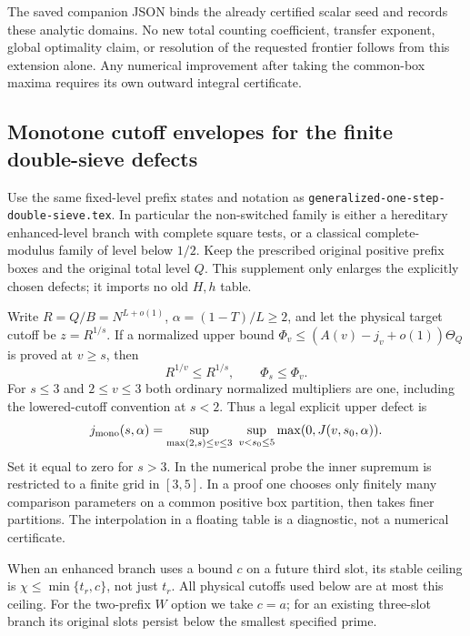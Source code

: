 \documentclass[11pt]{article}
\begin{document}
The saved companion JSON binds the already certified scalar seed
and records these analytic domains.  No new total counting
coefficient, transfer exponent, global optimality claim, or
resolution of the requested frontier follows from this extension
alone.  Any numerical improvement after taking the common-box
maxima requires its own outward integral certificate.

\subsection{Monotone cutoff envelopes for the finite double-sieve defects}
\label{sec:monotone-one-step-double-sieve}

Use the same fixed-level prefix states and notation as
\texttt{generalized-one-step-double-sieve.tex}. In particular the
non-switched family is either a hereditary enhanced-level branch
with complete square tests, or a classical complete-modulus family
of level below $1/2$. Keep the prescribed original positive prefix
boxes and the original total level $Q$. This supplement only enlarges
the explicitly chosen defects; it imports no old $H,h$ table.

Write $R=Q/B=N^{L+o(1)}$, $\alpha=(1-T)/L\ge2$, and let the
physical target cutoff be $z=R^{1/s}$. If a normalized upper bound
$\Phi_v\le(A(v)-j_v+o(1))\Theta_Q$ is proved at $v\ge s$, then
\[
 R^{1/v}\le R^{1/s},\qquad \Phi_s\le\Phi_v.
\]
For $s\le3$ and $2\le v\le3$ both ordinary normalized multipliers
are one, including the lowered-cutoff convention at $s<2$.
Thus a legal explicit upper defect is
\begin{equation}\label{eq:monotone-one-step-envelope}
 j_{\rm mono}(s,\alpha)
 =\sup_{\max(2,s)\le v\le3}\ \sup_{v<s_0\le5}
                  \max(0,J(v,s_0,\alpha)).
\end{equation}
Set it equal to zero for $s>3$. In the numerical probe the inner
supremum is restricted to a finite grid in $[3,5]$. In a proof one
chooses only finitely many comparison parameters on a common positive
box partition, then takes finer partitions. The interpolation in a
floating table is a diagnostic, not a numerical certificate.

When an enhanced branch uses a bound $c$ on a future third slot,
its stable ceiling is $\chi\le\min\{t_r,c\}$, not just $t_r$.
All physical cutoffs used below are at most this ceiling. For the
two-prefix $W$ option we take $c=a$; for an existing three-slot
branch its original slots persist below the smallest specified prime.
\end{document}
